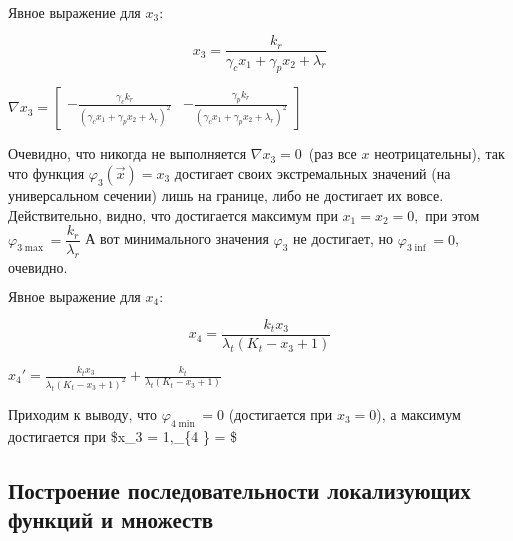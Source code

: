\documentclass[11pt]{article}
\begin{document}
    
    $ \text{Явное выражение для } x_3: $

    
    $$ x_3 = \frac{k_{r}}{\gamma_{c} x_{1} + \gamma_{p} x_{2} + \lambda_{r}}$$

    
    $\nabla x_3 = \left[\begin{matrix}- \frac{\gamma_{c} k_{r}}{\left(\gamma_{c} x_{1} + \gamma_{p} x_{2} + \lambda_{r}\right)^{2}} & - \frac{\gamma_{p} k_{r}}{\left(\gamma_{c} x_{1} + \gamma_{p} x_{2} + \lambda_{r}\right)^{2}}\end{matrix}\right] $

    
    Очевидно, что никогда не выполняется \(\nabla x_3 = 0\,\) (раз все \(x\)
неотрицательны), так что функция \(\varphi_3(\vec{x}) = x_3\) достигает
своих экстремальных значений (на универсальном сечении) лишь на границе,
либо не достигает их вовсе. Действительно, видно, что достигается
максимум при \(x_1 = x_2 = 0,\) при этом
\(\varphi_{3 \max} = \dfrac{k_r}{\lambda_r}\) А вот минимального
значения \(\varphi_3\) не достигает, но \(\varphi_{3 \inf} = 0\),
очевидно.

    $ \text{Явное выражение для } x_4: $

    
    $$ x_4 = \frac{k_{t} x_{3}}{\lambda_{t} \left(K_{t} - x_{3} + 1\right)}$$

    
    $x_4' = \frac{k_{t} x_{3}}{\lambda_{t} \left(K_{t} - x_{3} + 1\right)^{2}} + \frac{k_{t}}{\lambda_{t} \left(K_{t} - x_{3} + 1\right)} $

    
    Приходим к выводу, что \(\varphi_{4 \min} = 0\) (достигается при
\(x_3 = 0\)), а максимум достигается при \$x\_3 = 1,\varphi\_\{4 \max\}
=  \$

    \hypertarget{ux43fux43eux441ux442ux440ux43eux435ux43dux438ux435-ux43fux43eux441ux43bux435ux434ux43eux432ux430ux442ux435ux43bux44cux43dux43eux441ux442ux438-ux43bux43eux43aux430ux43bux438ux437ux443ux44eux449ux438ux445-ux444ux443ux43dux43aux446ux438ux439-ux438-ux43cux43dux43eux436ux435ux441ux442ux432}{%
\subsection{Построение последовательности локализующих функций и
множеств}\label{ux43fux43eux441ux442ux440ux43eux435ux43dux438ux435-ux43fux43eux441ux43bux435ux434ux43eux432ux430ux442ux435ux43bux44cux43dux43eux441ux442ux438-ux43bux43eux43aux430ux43bux438ux437ux443ux44eux449ux438ux445-ux444ux443ux43dux43aux446ux438ux439-ux438-ux43cux43dux43eux436ux435ux441ux442ux432}}


    
    
    
\end{document}

